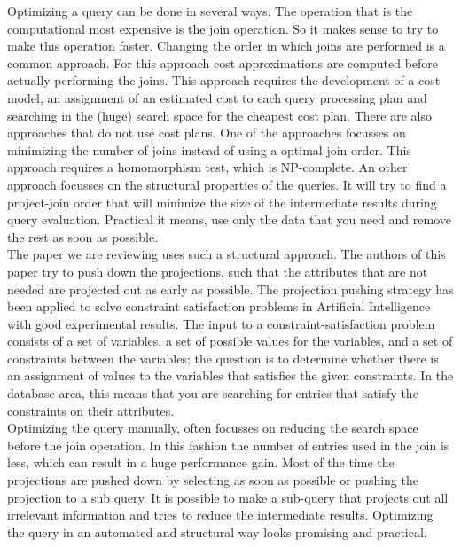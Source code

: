 Optimizing a query can be done in several ways. The operation that is the computational most expensive is the join operation. So it makes sense to try to make this operation faster. Changing the order in which joins are performed is a common approach. For this approach cost approximations are computed before actually performing the joins. This approach requires  the development of a cost model, an assignment of an estimated cost to each query processing plan and searching in the (huge) search space for the cheapest cost plan. There are also approaches that do not use cost plans. One of the approaches focusses on minimizing the number of joins instead of using a optimal join order. This approach requires a homomorphism test, which is NP-complete. An other approach focusses on the structural properties of the queries. It will try to find a project-join order that will minimize the size of the intermediate results during query evaluation. Practical it means, use only the data that you need and remove the rest as soon as possible. \\

The paper \cite{paper} we are reviewing uses such a structural approach. The authors of this paper try to push down the projections, such that the attributes that are not needed are projected out as early as possible. The projection pushing strategy has been applied to solve constraint satisfaction problems in Artificial Intelligence with good experimental results. The input to a constraint-satisfaction problem consists of a set of variables, a set of possible values for the variables, and a set of constraints between the variables; the question is to determine whether there is an assignment of values to the variables that satisfies the given constraints. In the database area, this means that you are searching for entries that satisfy the constraints on their attributes. \\

Optimizing the query manually, often focusses on reducing the search space before the join operation. In this fashion the number of entries used in the join is less, which can result in a huge performance gain. Most of the time the projections are pushed down by selecting as soon as possible or pushing the projection to a sub query. It is possible to make a sub-query that projects out all irrelevant information and tries to reduce the intermediate results. Optimizing the query in an automated and structural way looks promising and practical.  \\